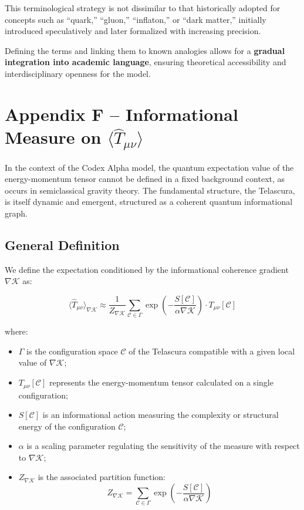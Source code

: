 \documentclass[12pt]{article}
\begin{document}
This terminological strategy is not dissimilar to that historically adopted for concepts such as “quark,” “gluon,” “inflaton,” or “dark matter,” initially introduced speculatively and later formalized with increasing precision.

Defining the terms and linking them to known analogies allows for a \textbf{gradual integration into academic language}, ensuring theoretical accessibility and interdisciplinary openness for the model.

\section*{Appendix F – Informational Measure on $\langle \hat{T}_{\mu\nu} \rangle$}

In the context of the Codex Alpha model, the quantum expectation value of the energy-momentum tensor cannot be defined in a fixed background context, as occurs in semiclassical gravity theory. The fundamental structure, the Telascura, is itself dynamic and emergent, structured as a coherent quantum informational graph.

\subsection*{General Definition}

We define the expectation conditioned by the informational coherence gradient $\nabla \mathcal{K}$ as:

\begin{equation}
\langle \hat{T}_{\mu\nu} \rangle_{\nabla \mathcal{K}} \approx \frac{1}{Z_{\nabla \mathcal{K}}} \sum_{\mathcal{C} \in \Gamma} \exp\left(-\frac{S[\mathcal{C}]}{\alpha \nabla \mathcal{K}} \right) \cdot T_{\mu\nu}[\mathcal{C}]
\label{eq:media_telascurica}
\end{equation}

where:
\begin{itemize}
    \item $\Gamma$ is the configuration space $\mathcal{C}$ of the Telascura compatible with a given local value of $\nabla \mathcal{K}$;
    \item $T_{\mu\nu}[\mathcal{C}]$ represents the energy-momentum tensor calculated on a single configuration;
    \item $S[\mathcal{C}]$ is an informational action measuring the complexity or structural energy of the configuration $\mathcal{C}$;
    \item $\alpha$ is a scaling parameter regulating the sensitivity of the measure with respect to $\nabla \mathcal{K}$;
    \item $Z_{\nabla \mathcal{K}}$ is the associated partition function:
    \begin{equation}
    Z_{\nabla \mathcal{K}} = \sum_{\mathcal{C} \in \Gamma} \exp\left(-\frac{S[\mathcal{C}]}{\alpha \nabla \mathcal{K}} \right)
    \end{equation}
\end{itemize}
\end{document}
